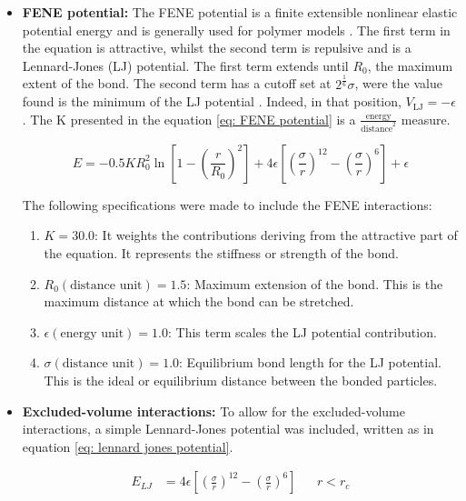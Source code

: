 \begin{itemize}
    \item \textbf{FENE potential: }The FENE potential is a finite extensible nonlinear elastic potential energy and is generally used for polymer models
    \cite{steveplimptonLAMMPS,thompsonLAMMPSFlexibleSimulation2022}. 
    The first term in the equation is attractive, whilst the second term is repulsive and is a Lennard-Jones (LJ) potential. The first term extends until $R_0$, the maximum extent of the bond. The second term has a cutoff set at $2^{\frac{1}{6}} \sigma$, were the value found is the minimum of the LJ potential
    \cite{thompsonLAMMPSFlexibleSimulation2022}. 
    Indeed, in that position, $V_{\text{LJ}} = -\epsilon$.
    The K presented in the equation \ref{eq: FENE potential} is a $\frac{\text{energy}}{\text{distance}^2}$ measure.

    \begin{equation} \label{eq: FENE potential}
        E = -0.5 K R_0^2 \ln{\left[1 - \left(\frac{r}{R_0}\right)^2\right]} + 4 \epsilon \left[\left(\frac{\sigma}{r}\right)^{12} - \left(\frac{\sigma}{r}\right)^6\right] + \epsilon
    \end{equation}

    The following specifications were made to include the FENE interactions:
    \begin{enumerate} %
        \item $K = 30.0$: It weights the contributions deriving from the attractive part of the equation. It represents the stiffness or strength of the bond.
        \item $R_0 (\text{distance unit}) = 1.5$: Maximum extension of the bond. This is the maximum distance at which the bond can be stretched.
        \item $\epsilon (\text{energy unit}) = 1.0$: This term scales the LJ potential contribution.
        \item $\sigma (\text{distance unit}) = 1.0$: Equilibrium bond length for the LJ potential. This is the ideal or equilibrium distance between the bonded particles.
    \end{enumerate}

    \item \textbf{Excluded-volume interactions: } To allow for the excluded-volume interactions, a simple Lennard-Jones potential was included, written as in equation \ref{eq: lennard jones potential}. %

    \begin{align} \label{eq: lennard jones potential}
        E_{LJ} &= 4 \epsilon \left[\left(\frac{\sigma}{r}\right)^{12} - \left(\frac{\sigma}{r}\right)^6\right]&& r < r_c
    \end{align}


\end{itemize}
